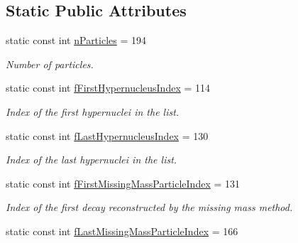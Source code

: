 \subsection*{Static Public Attributes}
\begin{DoxyCompactItemize}
\item 
static const int \hyperlink{classKFPartEfficiencies_a229165eeecbc664b7723d3ce588783e8}{n\+Particles} = 194\hypertarget{classKFPartEfficiencies_a229165eeecbc664b7723d3ce588783e8}{}\label{classKFPartEfficiencies_a229165eeecbc664b7723d3ce588783e8}

\begin{DoxyCompactList}\small\item\em Number of particles. \end{DoxyCompactList}\item 
static const int \hyperlink{classKFPartEfficiencies_a2c64f7d69d99fe6775db42741f55bbbe}{f\+First\+Hypernucleus\+Index} = 114\hypertarget{classKFPartEfficiencies_a2c64f7d69d99fe6775db42741f55bbbe}{}\label{classKFPartEfficiencies_a2c64f7d69d99fe6775db42741f55bbbe}

\begin{DoxyCompactList}\small\item\em Index of the first hypernuclei in the list. \end{DoxyCompactList}\item 
static const int \hyperlink{classKFPartEfficiencies_a0b4c54e513a38e19ada267f48affe056}{f\+Last\+Hypernucleus\+Index} = 130\hypertarget{classKFPartEfficiencies_a0b4c54e513a38e19ada267f48affe056}{}\label{classKFPartEfficiencies_a0b4c54e513a38e19ada267f48affe056}

\begin{DoxyCompactList}\small\item\em Index of the last hypernuclei in the list. \end{DoxyCompactList}\item 
static const int \hyperlink{classKFPartEfficiencies_a50c0554b3a82a0e0825451b97d8b7348}{f\+First\+Missing\+Mass\+Particle\+Index} = 131\hypertarget{classKFPartEfficiencies_a50c0554b3a82a0e0825451b97d8b7348}{}\label{classKFPartEfficiencies_a50c0554b3a82a0e0825451b97d8b7348}

\begin{DoxyCompactList}\small\item\em Index of the first decay reconstructed by the missing mass method. \end{DoxyCompactList}\item 
static const int \hyperlink{classKFPartEfficiencies_a1133cb34df9e58e2bdbc177e1761f5f2}{f\+Last\+Missing\+Mass\+Particle\+Index} = 166\hypertarget{classKFPartEfficiencies_a1133cb34df9e58e2bdbc177e1761f5f2}{}\label{classKFPartEfficiencies_a1133cb34df9e58e2bdbc177e1761f5f2}


\end{DoxyCompactItemize}
